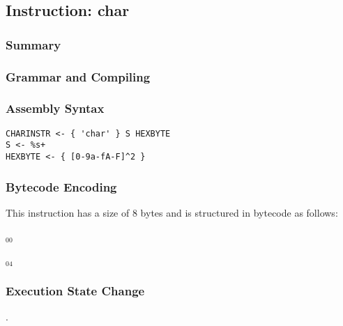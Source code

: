 \subsection{Instruction: char}

\subsubsection{Summary}


\subsubsection{Grammar and Compiling}


\subsubsection{Assembly Syntax}

\begin{myquote}
\begin{verbatim}
CHARINSTR <- { 'char' } S HEXBYTE
S <- %s+
HEXBYTE <- { [0-9a-fA-F]^2 }
\end{verbatim}
\end{myquote}

\subsubsection{Bytecode Encoding}

This instruction has a size of 8 bytes and is structured in bytecode as follows:

$_{00}$\ 



$_{04}$\ 


\subsubsection{Execution State Change}

.


